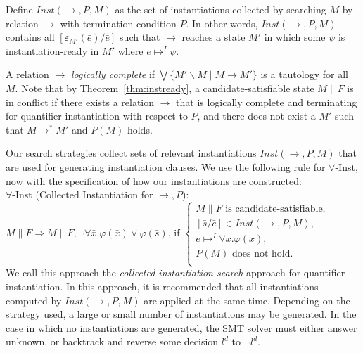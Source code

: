 \documentclass{llncs}
\begin{document}
Define $Inst( \rightarrow, P, M )$ as the set of instantiations collected by searching $M$ by relation $\rightarrow$ with termination condition $P$.
In other words, $Inst( \rightarrow, P, M )$ contains all $[\varepsilon_{M'}(\bar{e})/\bar{e}]$ such that $\rightarrow$ reaches a state $M'$ in which some $\psi$ is instantiation-ready in $M'$ where $\bar{e} \mapsto^I \psi$.

A relation $\rightarrow$ \emph{logically complete} if $\bigvee \{ M' \backslash M \mid M \rightarrow M' \}$ is a tautology for all $M$.
Note that by Theorem~\ref{thm:instready}, a candidate-satisfiable state $M \parallel F$ is in conflict if there exists a relation $\rightarrow$ that is logically complete and terminating for quantifier instantiation with respect to $P$, and there does not exist a $M'$ such that $M \rightarrow^\ast M'$ and $P(M)$ holds.

Our search strategies collect sets of relevant instantiations $Inst( \rightarrow, P, M )$ that are used for generating instantiation clauses.
We use the following rule for $\forall$-Inst, now with the specification of how our instantiations are constructed: \\

\noindent $\forall$-Inst (Collected Instantiation for $\rightarrow,P$): \\

$M \parallel F \Longrightarrow M \parallel F, \neg \forall \bar{x}. \varphi( \bar{ x } ) \vee \varphi( \bar{ s } )$, if   
$\begin{cases}
  M \parallel F \text{ is candidate-satisfiable}, \\
  [\bar{ s }/\bar{e}] \in Inst( \rightarrow, P, M ), \\ 
  \bar{e} \mapsto^I \forall \bar{x}. \varphi( \bar{ x } ), \\
  P( M ) \text{ does not hold}. \\ 
\end{cases}$ \\

We call this approach the \emph{collected instantiation search} approach for quantifier instantiation.
In this approach, it is recommended that all instantiations computed by $Inst( \rightarrow, P, M )$ are applied at the same time.
Depending on the strategy used, a large or small number of instantiations may be generated.
In the case in which no instantiations are generated, the SMT solver must either answer unknown, or backtrack and reverse some decision $l^d$ to $\neg l^d$.
\end{document}
